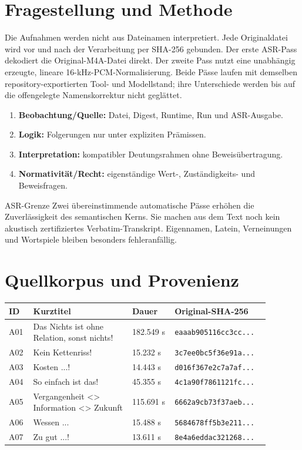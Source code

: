 \documentclass[11pt,a4paper]{article}
\begin{document}
\tableofcontents
\newpage

\section{Fragestellung und Methode}
Die Aufnahmen werden nicht aus Dateinamen interpretiert. Jede Originaldatei wird vor und nach der Verarbeitung per SHA-256 gebunden. Der erste ASR-Pass dekodiert die Original-M4A-Datei direkt. Der zweite Pass nutzt eine unabhängig erzeugte, lineare 16-kHz-PCM-Normalisierung. Beide Pässe laufen mit demselben repository-exportierten Tool- und Modellstand; ihre Unterschiede werden bis auf die offengelegte Namenskorrektur nicht geglättet.

\begin{enumerate}
\item \textbf{Beobachtung/Quelle:} Datei, Digest, Runtime, Run und ASR-Ausgabe.
\item \textbf{Logik:} Folgerungen nur unter expliziten Prämissen.
\item \textbf{Interpretation:} kompatibler Deutungsrahmen ohne Beweisübertragung.
\item \textbf{Normativität/Recht:} eigenständige Wert-, Zuständigkeits- und Beweisfragen.
\end{enumerate}

\begin{boundarybox}{ASR-Grenze}
Zwei übereinstimmende automatische Pässe erhöhen die Zuverlässigkeit des semantischen Kerns. Sie machen aus dem Text noch kein akustisch zertifiziertes Verbatim-Transkript. Eigennamen, Latein, Verneinungen und Wortspiele bleiben besonders fehleranfällig.
\end{boundarybox}

\section{Quellkorpus und Provenienz}
\begin{longtable}{p{0.08\linewidth}p{0.35\linewidth}p{0.15\linewidth}p{0.30\linewidth}}
\toprule
ID & Kurztitel & Dauer & Original-SHA-256 \\
\midrule
\endhead
A01 & Das Nichts ist ohne Relation, sonst nichts! & 182.549 s & \texttt{eaaab905116cc3cc...} \\
A02 & Kein Kettenriss! & 15.232 s & \texttt{3c7ee0bc5f36e91a...} \\
A03 & Kosten ...! & 14.443 s & \texttt{d016f367e2c7a7af...} \\
A04 & So einfach ist das! & 45.355 s & \texttt{4c1a90f7861121fc...} \\
A05 & Vergangenheit \textless{}\textgreater{} Information \textless{}\textgreater{} Zukunft & 115.691 s & \texttt{6662a9cb73f37aeb...} \\
A06 & Wessen ... & 15.488 s & \texttt{5684678ff5b3e211...} \\
A07 & Zu gut ...! & 13.611 s & \texttt{8e4a6eddac321268...} \\
\bottomrule
\end{longtable}
\end{document}
